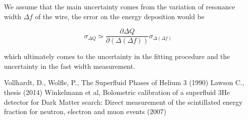 \documentclass[a4paper,10pt]{article}
\begin{document}
We assume that the main uncertainty comes from the variation of resonance width $\Delta f$ of the wire, the error on the energy deposition would be

\begin{equation}
  \sigma_{\Delta Q}  \simeq \frac{\partial \Delta Q}{\partial(\Delta(\Delta f))} \sigma_{\Delta (\Delta f)}
\end{equation}

which ultimately comes to the uncertainty in the fitting procedure and the uncertainty in the fast width measurement.

\pagebreak
\newpage

\begin{thebibliography}{9}

 Vollhardt, D., Wolfle, P., The Superfluid Phases of Helium 3 (1990)
 Lawson C., thesis (2014)
 Winkelmann et al, Bolometric calibration of a superfluid 3He detector for Dark Matter search: Direct measurement of the scintillated energy fraction for
neutron, electron and muon events (2007)

\end{thebibliography}
\end{document}
